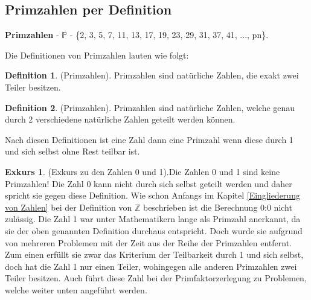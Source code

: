 \documentclass[12pt,a4paper]{article}
\theoremstyle{definition}
\newtheorem{defi}{Definition}[section]
\newtheorem{exkurs}{Exkurs}
\begin{document}
\subsection{Primzahlen per Definition}\label{Primzahlen per Definition}
\textbf{Primzahlen} - $\mathbb{P}$ - \{2, 3, 5, 7, 11, 13, 17, 19, 23, 29, 31, 37, 41, ..., pn\}.

Die Definitionen von Primzahlen lauten wie folgt:
\begin{defi}(Primzahlen).\newline
Primzahlen sind natürliche Zahlen, die exakt zwei Teiler besitzen.\end{defi}
\begin{defi}(Primzahlen).\newline
Primzahlen sind natürliche Zahlen, welche genau durch 2 verschiedene natürliche Zahlen geteilt werden können.\end{defi}

Nach diesen Definitionen ist eine Zahl dann eine Primzahl wenn diese durch 1 und sich selbst ohne Rest teilbar ist.

\begin{exkurs}(Exkurs zu den Zahlen 0 und 1).\label{Exkurs zu den Zahlen 0 und 1}\newline
Die Zahlen 0 und 1 sind keine Primzahlen!
Die Zahl 0 kann nicht durch sich selbst geteilt werden und daher spricht sie gegen diese Definition.
Wie schon Anfangs im Kapitel \ref{Eingliederung von Zahlen} bei der Definition von $\mathbb{Z}$ beschrieben ist die Berechnung 0:0 nicht zulässig.\newline
Die Zahl 1 war unter Mathematikern lange als Primzahl anerkannt, da sie der oben genannten Definition durchaus entspricht.
Doch wurde sie aufgrund von mehreren Problemen mit der Zeit aus der Reihe der Primzahlen entfernt.
Zum einen erfüllt sie zwar das Kriterium der Teilbarkeit durch 1 und sich selbst, doch hat die Zahl 1 nur einen Teiler, wohingegen alle anderen Primzahlen zwei Teiler besitzen.
Auch führt diese Zahl bei der Primfaktorzerlegung zu Problemen, welche weiter unten angeführt werden.
\end{exkurs}
\end{document}

